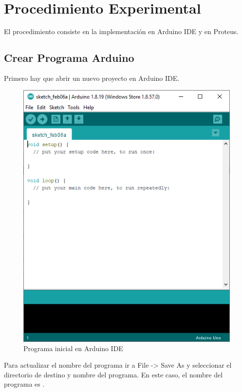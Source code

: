 \documentclass{article}
\begin{document}
\section{Procedimiento Experimental}

El procedimiento consiste en la implementación en Arduino IDE y en Proteus.

\subsection{Crear Programa Arduino}

Primero hay que abrir un nuevo proyecto en Arduino IDE.

\begin{figure}[H]
    \centering
    \includegraphics[width=0.5\paperwidth]{images/arduino-1.png}
    \caption{Programa inicial en Arduino IDE}
\end{figure}

Para actualizar el nombre del programa ir a File -> Save As y seleccionar el directorio de destino y nombre del programa. En este caso, el nombre del programa es .
\end{document}
